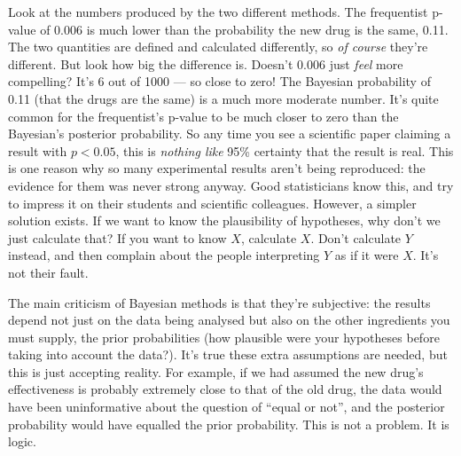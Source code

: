 \documentclass[a4paper, 12pt]{article}
\begin{document}
Look at the numbers produced by the two different methods. The frequentist p-value of 0.006 is much lower than the probability the new drug is the same, 0.11.
The two quantities are defined and calculated differently, so {\em of course} they're different. But look how big the difference is.
Doesn't 0.006 just {\em feel}
more compelling? It's 6 out of 1000 --- so close to zero!
The Bayesian probability of 0.11 (that the drugs are the same) is a much
more moderate number. It's quite common for the frequentist's p-value to
be much closer to zero than the Bayesian's posterior probability.
So any time you see a scientific paper claiming a result with $p < 0.05$, this
is {\em nothing like} 95\% certainty that the result is real. This is one
reason why so many experimental results aren't being reproduced: the evidence
for them was never strong anyway.
Good statisticians know this, and try to impress it on their students and
scientific colleagues. However, a simpler solution exists. If we want to know
the plausibility of hypotheses, why don't we just calculate that? If you want
to know $X$, calculate $X$. Don't calculate $Y$ instead, and then complain
about the people interpreting $Y$ as if it were $X$. It's not their fault.

The main criticism of Bayesian methods is that they're subjective: the results
depend not just on the data being analysed but also on the other ingredients
you must supply, the prior probabilities (how plausible were your hypotheses
before taking into account the data?). It's true these extra assumptions are
needed, but this is just accepting reality. For example, if we had assumed
the new drug's effectiveness is probably extremely close to that of the old drug,
the data would have been uninformative about the question of ``equal or not'',
and the posterior probability would have equalled the prior probability. This
is not a problem. It is logic.
\end{document}
